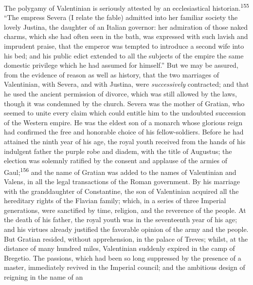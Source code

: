 
The polygamy of Valentinian is seriously attested by an
ecclesiastical historian.\textsuperscript{155} “The empress Severa (I relate the
fable) admitted into her familiar society the lovely Justina, the
daughter of an Italian governor: her admiration of those naked
charms, which she had often seen in the bath, was expressed with
such lavish and imprudent praise, that the emperor was tempted to
introduce a second wife into his bed; and his public edict
extended to all the subjects of the empire the same domestic
privilege which he had assumed for himself.” But we may be
assured, from the evidence of reason as well as history, that the
two marriages of Valentinian, with Severa, and with Justina, were
\textit{successively} contracted; and that he used the ancient
permission of divorce, which was still allowed by the laws,
though it was condemned by the church. Severa was the mother of
Gratian, who seemed to unite every claim which could entitle him
to the undoubted succession of the Western empire. He was the
eldest son of a monarch whose glorious reign had confirmed the
free and honorable choice of his fellow-soldiers. Before he had
attained the ninth year of his age, the royal youth received from
the hands of his indulgent father the purple robe and diadem,
with the title of Augustus; the election was solemnly ratified by
the consent and applause of the armies of Gaul;\textsuperscript{156} and the name
of Gratian was added to the names of Valentinian and Valens, in
all the legal transactions of the Roman government. By his
marriage with the granddaughter of Constantine, the son of
Valentinian acquired all the hereditary rights of the Flavian
family; which, in a series of three Imperial generations, were
sanctified by time, religion, and the reverence of the people. At
the death of his father, the royal youth was in the seventeenth
year of his age; and his virtues already justified the favorable
opinion of the army and the people. But Gratian resided, without
apprehension, in the palace of Treves; whilst, at the distance of
many hundred miles, Valentinian suddenly expired in the camp of
Bregetio. The passions, which had been so long suppressed by the
presence of a master, immediately revived in the Imperial
council; and the ambitious design of reigning in the name of an
